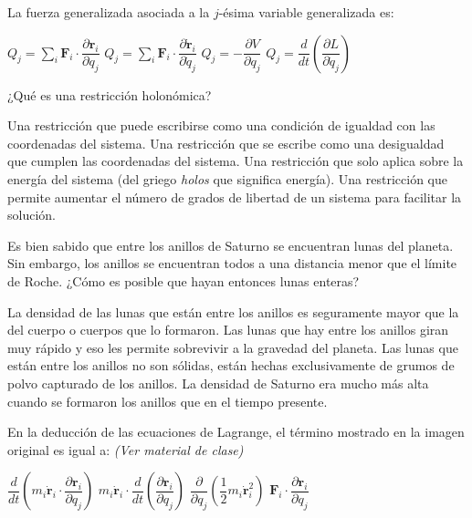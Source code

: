 \documentclass[12pt,addpoints]{exam}
\begin{document}
\begin{questions}
\question La fuerza generalizada asociada a la $j$-ésima variable generalizada es:
\begin{choices}
\choice $Q_j = \sum_i \mathbf{F}_i \cdot \dfrac{\partial \mathbf{r}_i}{\partial q_j}$
\choice $Q_j = \sum_i \mathbf{F}_i \cdot \dfrac{\partial \dot{\mathbf{r}}_i}{\partial \dot{q}_j}$
\choice $Q_j = -\dfrac{\partial V}{\partial q_j}$
\choice $Q_j = \dfrac{d}{dt} \left( \dfrac{\partial L}{\partial \dot{q}_j} \right)$
\end{choices}

\question ¿Qué es una restricción holonómica?
\begin{choices}
\choice Una restricción que puede escribirse como una condición de igualdad con las coordenadas del sistema.
\choice Una restricción que se escribe como una desigualdad que cumplen las coordenadas del sistema.
\choice Una restricción que solo aplica sobre la energía del sistema (del griego \textit{holos} que significa energía).
\choice Una restricción que permite aumentar el número de grados de libertad de un sistema para facilitar la solución.
\end{choices}

\question Es bien sabido que entre los anillos de Saturno se encuentran lunas del planeta. Sin embargo, los anillos se encuentran todos a una distancia menor que el límite de Roche. ¿Cómo es posible que hayan entonces lunas enteras?
\begin{choices}
\choice La densidad de las lunas que están entre los anillos es seguramente mayor que la del cuerpo o cuerpos que lo formaron.
\choice Las lunas que hay entre los anillos giran muy rápido y eso les permite sobrevivir a la gravedad del planeta.
\choice Las lunas que están entre los anillos no son sólidas, están hechas exclusivamente de grumos de polvo capturado de los anillos.
\choice La densidad de Saturno era mucho más alta cuando se formaron los anillos que en el tiempo presente.
\end{choices}

\question En la deducción de las ecuaciones de Lagrange, el término mostrado en la imagen original es igual a: \textit{(Ver material de clase)}
\begin{choices}
\choice $\dfrac{d}{dt} \left( m_i \dot{\mathbf{r}}_i \cdot \dfrac{\partial \mathbf{r}_i}{\partial q_j} \right)$
\choice $m_i \dot{\mathbf{r}}_i \cdot \dfrac{d}{dt} \left( \dfrac{\partial \mathbf{r}_i}{\partial q_j} \right)$
\choice $\dfrac{\partial}{\partial q_j} \left( \dfrac{1}{2} m_i \dot{\mathbf{r}}_i^2 \right)$
\choice $\mathbf{F}_i \cdot \dfrac{\partial \mathbf{r}_i}{\partial q_j}$
\end{choices}


\end{questions}
\end{document}
